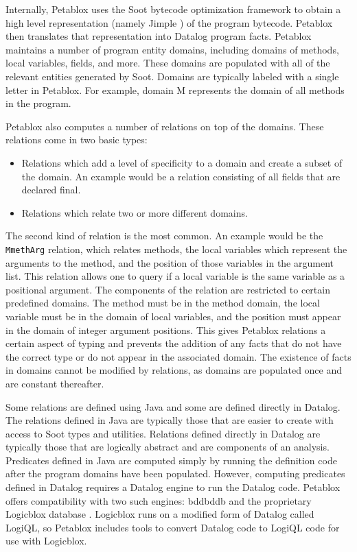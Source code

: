 Internally, Petablox uses the Soot bytecode optimization framework
\cite{vallee1999soot} to obtain a high level representation (namely
Jimple \cite{vallee1998jimple}) of the program bytecode. Petablox then
translates that representation into Datalog program facts. Petablox
maintains a number of program entity domains, including domains of
methods, local variables, fields, and more. These domains are
populated with all of the relevant entities generated by Soot. Domains
are typically labeled with a single letter in Petablox. For example,
domain M represents the domain of all methods in the program.

Petablox also computes a number of relations on top of the
domains. These relations come in two basic types:

\begin{itemize}
  \item Relations which add a level of specificity to a domain and
    create a subset of the domain. An example would be a relation
    consisting of all fields that are declared final.
  \item Relations which relate two or more different domains.
\end{itemize}

The second kind of relation is the most common. An example would be
the \texttt{MmethArg} relation, which relates methods, the local
variables which represent the arguments to the method, and the
position of those variables in the argument list. This relation allows
one to query if a local variable is the same variable as a positional
argument. The components of the relation are restricted to certain
predefined domains. The method must be in the method domain, the local
variable must be in the domain of local variables, and the position
must appear in the domain of integer argument positions. This gives
Petablox relations a certain aspect of typing and prevents the
addition of any facts that do not have the correct type or do not
appear in the associated domain. The existence of facts in domains
cannot be modified by relations, as domains are populated once and are
constant thereafter.

Some relations are defined using Java and some are defined directly in
Datalog. The relations defined in Java are typically those that are
easier to create with access to Soot types and utilities. Relations
defined directly in Datalog are typically those that are logically
abstract and are components of an analysis. Predicates defined in Java
are computed simply by running the definition code after the program
domains have been populated. However, computing predicates defined in
Datalog requires a Datalog engine to run the Datalog code. Petablox
offers compatibility with two such engines: bddbddb \cite{bddbddb} and
the proprietary Logicblox database \cite{logicblox}. Logicblox runs on
a modified form of Datalog called LogiQL, so Petablox includes tools
to convert Datalog code to LogiQL code for use with Logicblox.

